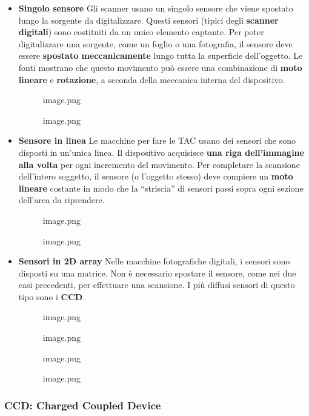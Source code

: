 \documentclass[
]{article}
\begin{document}
\begin{itemize}
\item
  \textbf{Singolo sensore}
  Gli scanner usano un singolo sensore che viene spostato lungo la sorgente da digitalizzare.
  Questi sensori (tipici degli \textbf{scanner digitali}) sono costituiti da un unico elemento captante. Per poter digitalizzare una sorgente, come un foglio o una fotografia, il sensore deve essere \textbf{spostato meccanicamente} lungo tutta la superficie dell'oggetto. Le fonti mostrano che questo movimento può essere una combinazione di \textbf{moto lineare} e \textbf{rotazione}, a seconda della meccanica interna del dispositivo.

  \begin{figure}
  \centering
  {image.png}
  \caption{image.png}
  \end{figure}
\item
  \textbf{Sensore in linea}
  Le macchine per fare le TAC usano dei sensori che sono disposti in un'unica linea.
  Il dispositivo acquisisce \textbf{una riga dell'immagine alla volta} per ogni incremento del movimento. Per completare la scansione dell'intero soggetto, il sensore (o l'oggetto stesso) deve compiere un \textbf{moto lineare} costante in modo che la ``striscia'' di sensori passi sopra ogni sezione dell'area da riprendere.

  \begin{figure}
  \centering
  {image.png}
  \caption{image.png}
  \end{figure}
\item
  \textbf{Sensori in 2D array}
  Nelle macchine fotografiche digitali, i sensori sono disposti su una matrice. Non è necessario spostare il sensore, come nei due casi precedenti, per effettuare una scansione. I più diffusi sensori di questo tipo sono i \textbf{CCD}.

  \begin{figure}
  \centering
  {image.png}
  \caption{image.png}
  \end{figure}

  \begin{figure}
  \centering
  {image.png}
  \caption{image.png}
  \end{figure}
\end{itemize}

\hypertarget{ccd-charged-coupled-device}{%
\subsubsection{CCD: Charged Coupled Device}\label{ccd-charged-coupled-device}}
\end{document}
